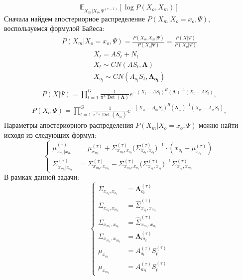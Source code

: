 \documentclass[11pt]{article}
\newcommand{\Expect}{\mathbb{E}}
\DeclareMathOperator{\Det}{Det}
\begin{document}
\begin{equation}
 \Expect_{X_m|X_o, \Psi^{(\tau-1)}}[\log P(X_o, X_m)]
\end{equation}
Сначала найдем апостериорное распределение $P(X_m|X_o=x_o,\Psi)$, воспользуемся формулой Байеса:
\begin{gather}
P(X_m|X_o=x_o,\Psi) = \frac{P(X_o, X_m|\Psi)}{P(X_o|\Psi)} = \frac{P(X|\Psi)}{P(X_o|\Psi)}
\end{gather}
\begin{gather*}
X_t = AS_t + N_t \\
X_t \sim CN(A S_t,\mathbf{\Lambda})\\
X_{o_t} \sim CN( A_{o_t}S_t, \mathbf{\Lambda_{o_t}})\\
\end{gather*}
\begin{gather}
P(X|\Psi) = \prod_{t=1}^G \frac{1}{\pi^L \Det(\mathbf{\Lambda})}e^{-(X_t-AS_t)^H (\mathbf{\Lambda})^{-1}(X_t-AS_t)},
\end{gather}
\begin{gather}
P(X_o|\Psi) = \prod_{t=1}^G \frac{1}{\pi^{L_{o_t}} \Det(\mathbf{\Lambda}_{o_t})}e^{-(X_{o_t}-A_{o_t}S_t)^H (\mathbf{\Lambda}_{o_t})^{-1}(X_{o_t}-A_{o_t}S_t)},
\end{gather}
Параметры апостериорного распределения $P(X_m|X_o=x_o,\Psi)$ можно найти исходя из следующих формул:
\begin{equation}
\left\{ \begin{aligned}
\mu_{x_{m_t}|x_{o_t}}^{(\tau)} &= \mu_{x_{m_t}}^{(\tau)} + \Sigma_{x_{m_t},x_{o_t}}^{(\tau)}\Big(\Sigma_{x_{o_t},x_{o_t}}^{(\tau)}\Big)^{-1}\cdot(x_{o_t}-\mu_{x_{o_t}}^{(\tau)}) \\
\Sigma_{x_{m_t}|x_{o_t}}^{(\tau)} &= \Sigma_{x_{m_t},x_{m_t}}^{(\tau)}-\Sigma_{x_{m_t},x_{o_t}}^{(\tau)}\Big(\Sigma_{x_{o_t},x_{o_t}}^{(\tau)}\Big)^{-1}\Sigma_{x_{o_t},x_{m_t}}^{(\tau)}
\end{aligned} \right.
\end{equation}
В рамках данной задачи:
\begin{equation}
\left\{ \begin{aligned} 
\Sigma_{x_{o_t},x_{o_t}} &= \mathbf{\Lambda}_{o_t}^{(\tau)} \\
\Sigma_{x_{o_t},x_{m_t}} &= \hat{\Sigma}_{x_{o_t},x_{m_t}}^{(\tau)} \\
\Sigma_{x_{m_t},x_{o_t}} &= \hat{\Sigma}_{x_{m_t},x_{o_t}}^{(\tau)} \\
\Sigma_{x_{m_t},x_{m_t}} &= \mathbf{\Lambda}_{m_t}^{(\tau)} \\
\mu_{x_{o_t}} &= A_{o_t}^{(\tau)}S_t^{(\tau)} \\
\mu_{x_{m_t}} &= A_{m_t}^{(\tau)}S_t^{(\tau)}
\end{aligned} \right.
\end{equation}
\end{document}
